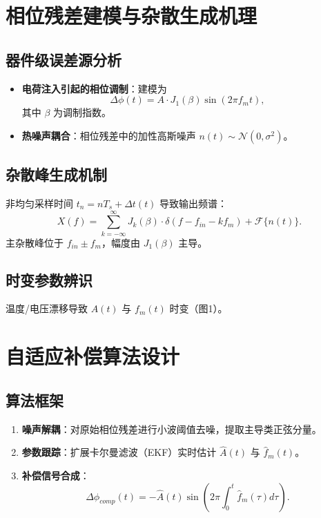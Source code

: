 \documentclass[conference]{IEEEtran}
\begin{document}
\section{相位残差建模与杂散生成机理}

\subsection{器件级误差源分析}
\begin{itemize}
    \item \textbf{电荷注入引起的相位调制}：建模为
    \[
    \Delta \phi(t) = A \cdot J_1(\beta) \sin(2\pi f_m t),
    \]
    其中 $\beta$ 为调制指数。
    \item \textbf{热噪声耦合}：相位残差中的加性高斯噪声 $n(t) \sim \mathcal{N}(0, \sigma^2)$。
\end{itemize}

\subsection{杂散峰生成机制}
非均匀采样时间 $t_n = nT_s + \Delta t(t)$ 导致输出频谱：
\[
X(f) = \sum_{k=-\infty}^{\infty} J_k(\beta) \cdot \delta(f - f_{in} - kf_m) + \mathcal{F}\{n(t)\}.
\]
主杂散峰位于 $f_{in} \pm f_m$，幅度由 $J_1(\beta)$ 主导。

\subsection{时变参数辨识}
温度/电压漂移导致 $A(t)$ 与 $f_m(t)$ 时变（图1）。

\section{自适应补偿算法设计}

\subsection{算法框架}
\begin{enumerate}
    \item \textbf{噪声解耦}：对原始相位残差进行小波阈值去噪，提取主导类正弦分量。
    \item \textbf{参数跟踪}：扩展卡尔曼滤波（EKF）实时估计 $\hat{A}(t)$ 与 $\hat{f}_m(t)$。
    \item \textbf{补偿信号合成}：
    \[
    \Delta \phi_{comp}(t) = -\hat{A}(t) \sin\left(2\pi \int_0^t \hat{f}_m(\tau)d\tau \right).
    \]
\end{enumerate}
\end{document}
